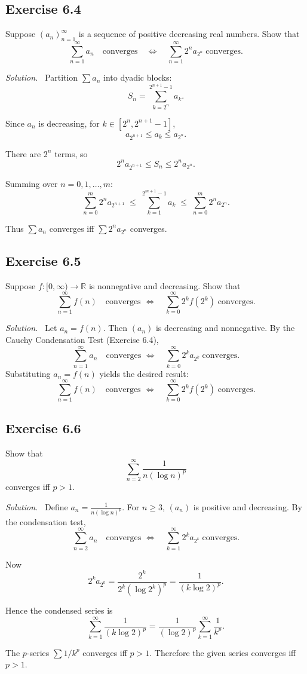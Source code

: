 \documentclass[11pt,a4paper]{article}
\newenvironment{solution}{\par\noindent\textit{Solution.}\ }{\par\vspace{0.5em}}
\begin{document}
\subsection*{Exercise 6.4}
Suppose $(a_n)_{n=1}^\infty$ is a sequence of positive decreasing real numbers. 
Show that
\[
\sum_{n=1}^\infty a_n \quad\text{converges} \quad\iff\quad \sum_{n=1}^\infty 2^n a_{2^n}\;\text{converges}.
\]

\begin{solution}
	Partition $\sum a_n$ into dyadic blocks:
	\[
	S_n = \sum_{k=2^n}^{2^{n+1}-1} a_k.
	\]
	
	Since $a_n$ is decreasing, for $k\in[2^n,2^{n+1}-1]$,
	\[
	a_{2^{n+1}} \leq a_k \leq a_{2^n}.
	\]
	
	There are $2^n$ terms, so
	\[
	2^n a_{2^{n+1}} \leq S_n \leq 2^n a_{2^n}.
	\]
	
	Summing over $n=0,1,\dots,m$:
	\[
	\sum_{n=0}^m 2^n a_{2^{n+1}} \;\leq\; \sum_{k=1}^{2^{m+1}-1} a_k \;\leq\; \sum_{n=0}^m 2^n a_{2^n}.
	\]
	
	Thus $\sum a_n$ converges iff $\sum 2^n a_{2^n}$ converges.
\end{solution}


\subsection*{Exercise 6.5}
Suppose $f:[0,\infty)\to\mathbb{R}$ is nonnegative and decreasing. 
Show that
\[
\sum_{n=1}^\infty f(n) \quad \text{converges } \iff \quad \sum_{k=0}^\infty 2^k f(2^k)\;\text{converges}.
\]

\begin{solution}
	Let $a_n=f(n)$. Then $(a_n)$ is decreasing and nonnegative. By the Cauchy 
	Condensation Test (Exercise 6.4),
	\[
	\sum_{n=1}^\infty a_n \quad \text{converges } \iff \quad \sum_{k=0}^\infty 2^k a_{2^k} \;\text{converges}.
	\]
	Substituting $a_n=f(n)$ yields the desired result:
	\[
	\sum_{n=1}^\infty f(n) \quad \text{converges } \iff \quad \sum_{k=0}^\infty 2^k f(2^k) \;\text{converges}.
	\]
\end{solution}


\subsection*{Exercise 6.6}
Show that
\[
\sum_{n=2}^\infty \frac{1}{n(\log n)^p}
\]
converges iff $p>1$.

\begin{solution}
	Define $a_n=\frac{1}{n(\log n)^p}$. For $n\geq 3$, $(a_n)$ is positive and 
	decreasing. By the condensation test,
	\[
	\sum_{n=2}^\infty a_n \quad \text{converges } \iff \quad \sum_{k=1}^\infty 2^k a_{2^k} \;\text{converges}.
	\]
	
	Now
	\[
	2^k a_{2^k} = \frac{2^k}{2^k (\log 2^k)^p} = \frac{1}{(k\log 2)^p}.
	\]
	
	Hence the condensed series is
	\[
	\sum_{k=1}^\infty \frac{1}{(k\log 2)^p} = \frac{1}{(\log 2)^p}\sum_{k=1}^\infty \frac{1}{k^p}.
	\]
	
	The $p$-series $\sum 1/k^p$ converges iff $p>1$. Therefore the given series 
	converges iff $p>1$.
\end{solution}
\end{document}
